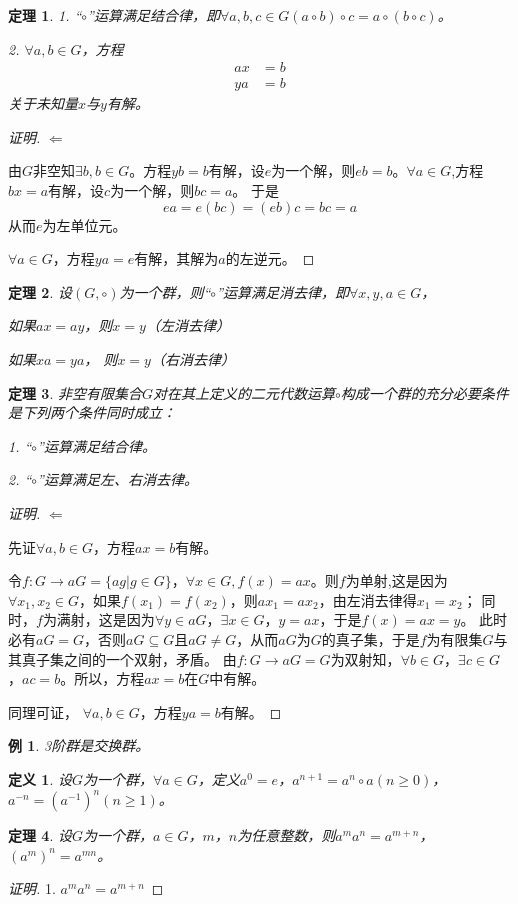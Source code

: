 \documentclass{article}
\newtheorem{Def}{定义}
\newtheorem{Thm}{定理}
\newtheorem*{Example}{例}
\begin{document}
\begin{CJK*}{UTF8}{gbsn}
\begin{Thm}
  1. “$\circ$”运算满足结合律，即$\forall a,b,c\in G (a\circ b)\circ c=a\circ(b\circ c)$。

  2. $\forall a,b\in G$，方程
  \begin{align*}
    ax&=b\\
    ya&=b
   \end{align*}
   关于未知量$x$与$y$有解。
\end{Thm}
\begin{proof}[证明]

  $\Leftarrow$

  由$G$非空知$\exists b,b\in G$。方程$yb=b$有解，设$e$为一个解，则$eb=b$。$\forall a\in G$,方程$bx=a$有解，设$c$为一个解，则$bc=a$。
  于是
  \[ea=e(bc)=(eb)c=bc=a\]
  从而$e$为左单位元。

  $\forall a\in G$，方程$ya=e$有解，其解为$a$的左逆元。
\end{proof}
\begin{Thm}
  设$(G,\circ)$为一个群，则“$\circ$”运算满足消去律，即$\forall x, y, a\in G$，

  如果$ax = ay$，则$x=y$（左消去律）

  如果$xa = ya$， 则$x=y$（右消去律）
\end{Thm}

\begin{Thm}
  非空有限集合$G$对在其上定义的二元代数运算$\circ$构成一个群的充分必要条件是下列两个条件同时成立：

  1. “$\circ$”运算满足结合律。

  2. “$\circ$”运算满足左、右消去律。
\end{Thm}
\begin{proof}[证明]
$\Leftarrow$

先证$\forall a,b\in G$，方程$ax=b$有解。

令$f:G\to aG=\{ag|g\in G\}$，$\forall x\in G, f(x)=ax$。则$f$为单射,这是因为$\forall x_1,x_2\in G$，如果$f(x_1)=f(x_2)$，则$ax_1=ax_2$，由左消去律得$x_1=x_2$；
同时，$f$为满射，这是因为$\forall y\in aG$，$\exists x\in G$，$y=ax$，于是$f(x)=ax=y$。
此时必有$aG=G$，否则$aG\subseteq G$且$aG\neq G$，从而$aG$为$G$的真子集，于是$f$为有限集$G$与其真子集之间的一个双射，矛盾。
由$f:G\to aG=G$为双射知，$\forall b\in G$，$\exists c\in G$，$ac=b$。所以，方程$ax=b$在$G$中有解。

同理可证，  $\forall a,b\in G$，方程$ya=b$有解。
\end{proof}

\begin{Example}
  3阶群是交换群。
\end{Example}
\begin{Def}
  设$G$为一个群，$\forall a\in G$，定义$a^0=e$，$a^{n+1}=a^n\circ a$$(n\geq 0)$，$a^{-n}=(a^{-1})^n$$(n\geq 1)$。
\end{Def}
\begin{Thm}
设$G$为一个群，$a\in G$，$m$，$n$为任意整数，则$a^ma^n=a^{m+n}$，$(a^m)^n=a^{mn}$。
\end{Thm}
\begin{proof}[证明]
  1. $a^ma^n=a^{m+n}$


\end{proof}
\end{CJK*}
\end{document}
